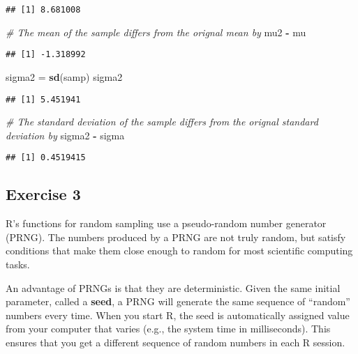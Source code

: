 \documentclass[
]{article}
\newenvironment{Shaded}{\begin{snugshade}}{\end{snugshade}}
\newcommand{\CommentTok}[1]{\textcolor[rgb]{0.56,0.35,0.01}{\textit{#1}}}
\newcommand{\KeywordTok}[1]{\textcolor[rgb]{0.13,0.29,0.53}{\textbf{#1}}}
\newcommand{\NormalTok}[1]{#1}
\newcommand{\OperatorTok}[1]{\textcolor[rgb]{0.81,0.36,0.00}{\textbf{#1}}}
\newcommand{\StringTok}[1]{\textcolor[rgb]{0.31,0.60,0.02}{#1}}
\begin{document}
\begin{verbatim}
## [1] 8.681008
\end{verbatim}

\begin{Shaded}
\begin{Highlighting}[]
\CommentTok{\# The mean of the sample differs from the orignal mean by}
\NormalTok{mu2 }\OperatorTok{{-}}\StringTok{ }\NormalTok{mu}
\end{Highlighting}
\end{Shaded}

\begin{verbatim}
## [1] -1.318992
\end{verbatim}

\begin{Shaded}
\begin{Highlighting}[]
\NormalTok{sigma2 =}\StringTok{ }\KeywordTok{sd}\NormalTok{(samp)}
\NormalTok{sigma2}
\end{Highlighting}
\end{Shaded}

\begin{verbatim}
## [1] 5.451941
\end{verbatim}

\begin{Shaded}
\begin{Highlighting}[]
\CommentTok{\# The standard deviation of the sample differs from the orignal standard deviation by}
\NormalTok{sigma2 }\OperatorTok{{-}}\StringTok{ }\NormalTok{sigma}
\end{Highlighting}
\end{Shaded}

\begin{verbatim}
## [1] 0.4519415
\end{verbatim}

\hypertarget{exercise-3}{%
\subsection{Exercise 3}\label{exercise-3}}

R's functions for random sampling use a pseudo-random number generator
(PRNG). The numbers produced by a PRNG are not truly random, but satisfy
conditions that make them close enough to random for most scientific
computing tasks.

An advantage of PRNGs is that they are deterministic. Given the same
initial parameter, called a \textbf{seed}, a PRNG will generate the same
sequence of ``random'' numbers every time. When you start R, the seed is
automatically assigned value from your computer that varies (e.g., the
system time in milliseconds). This ensures that you get a different
sequence of random numbers in each R session.
\end{document}
